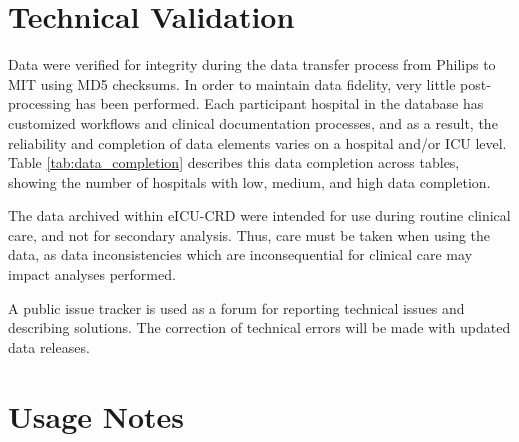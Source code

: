 \documentclass[english]{article}
\begin{document}
\section*{Technical Validation}\label{technical-validation}


Data were verified for integrity during the data transfer process from
Philips to MIT using MD5 checksums.
In order to maintain data fidelity, very little post-processing has been performed.
Each participant hospital in the database has customized
workflows and clinical documentation processes, and as a result, the
reliability and completion of data elements varies on a hospital and/or
ICU level.
Table \ref{tab:data_completion} describes this data completion across tables, showing the number of hospitals with low, medium, and high data completion.

The data archived within eICU-CRD were intended for use during routine clinical care, and not for secondary analysis. Thus, care must be taken when using the data, as data inconsistencies which are inconsequential for clinical care may impact analyses performed.

A public issue tracker is used as a forum for reporting technical issues
and describing solutions. The correction of
technical errors will be made with updated data releases.

\section*{Usage Notes}\label{usage-notes}

\end{document}
